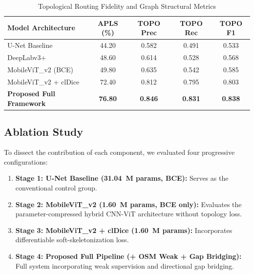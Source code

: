 \documentclass[conference]{IEEEtran}
\begin{document}
\begin{table}[t]
\centering
\caption{Topological Routing Fidelity and Graph Structural Metrics}
\label{tab:topo_metrics}
\begin{tabular}{lcccc}
\toprule
\textbf{Model Architecture} & \textbf{APLS (\%)} & \textbf{TOPO Prec} & \textbf{TOPO Rec} & \textbf{TOPO F1} \\
\midrule
U-Net Baseline~\cite{ronneberger2015unet} & 44.20 & 0.582 & 0.491 & 0.533 \\
DeepLabv3+~\cite{chen2017deeplab} & 48.60 & 0.614 & 0.528 & 0.568 \\
MobileViT\_v2 (BCE) & 49.80 & 0.635 & 0.542 & 0.585 \\
MobileViT\_v2 + clDice & 72.40 & 0.812 & 0.795 & 0.803 \\
\textbf{Proposed Full Framework} & \textbf{76.80} & \textbf{0.846} & \textbf{0.831} & \textbf{0.838} \\
\bottomrule
\end{tabular}
\end{table}

\subsection{Ablation Study}
To dissect the contribution of each component, we evaluated four progressive configurations:
\begin{enumerate}
    \item \textbf{Stage 1: U-Net Baseline (31.04~M params, BCE):} Serves as the conventional control group.
    \item \textbf{Stage 2: MobileViT\_v2 (1.60~M params, BCE only):} Evaluates the parameter-compressed hybrid CNN-ViT architecture without topology loss.
    \item \textbf{Stage 3: MobileViT\_v2 + clDice (1.60~M params):} Incorporates differentiable soft-skeletonization loss.
    \item \textbf{Stage 4: Proposed Full Pipeline (+ OSM Weak + Gap Bridging):} Full system incorporating weak supervision and directional gap bridging.
\end{enumerate}

\begin{table}[t]
\centering
\caption{Four-Stage Ablation Study Detailing Modular Gains}
\label{tab:ablation}
\end{table}
\end{document}
